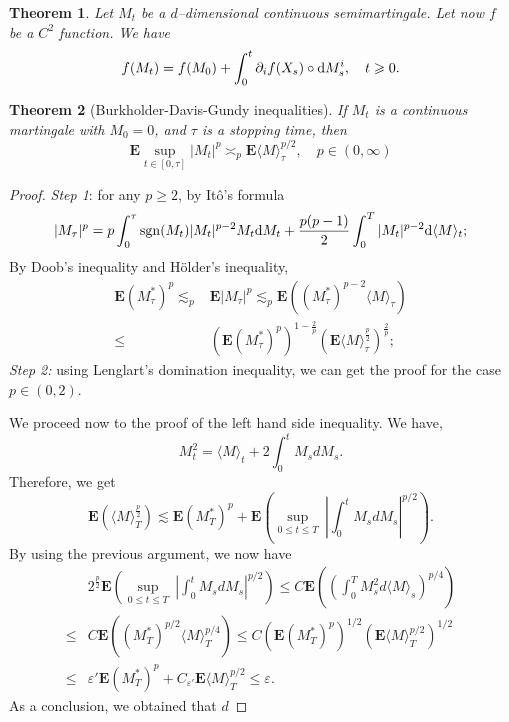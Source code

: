 \documentclass[twoside, 12pt]{book}
\numberwithin{equation}{chapter}
\newtheorem{theorem}{Theorem}[section]
\def\bE{{\mathbf E}}
\def\geq{\geqslant}
\def\leq{\leqslant}
\def\le{\leqslant}
\def\d{\text{\rm{d}}}
\def\eps{\varepsilon}
\begin{document}
\begin{theorem}\label{thm:Stra}
    Let  $M_t$ be a $d$–dimensional continuous semimartingale. Let now $f$ be a $C^2$ function. We have
    \[
    f(M_t)  =f(M_0)+\int_0^t \partial_i f (X_s) \circ \d M^i_s, \quad t \geq 0.
    \]
\end{theorem}
	
	\begin{theorem}[{Burkholder-Davis-Gundy inequalities}]
		If $M_t$ is a continuous martingale with $M_0=0$, and $\tau$ is a stopping time, then 
		\begin{equation}\label{eq:bdg}
			\bE \sup_{t\in[0,\tau]} |M_t|^p \asymp_p \bE \langle M\rangle_\tau^{p/2}, \quad p\in (0,\infty) 
		\end{equation}
	\end{theorem}
	\begin{proof}
		{\em Step 1}: for any $p\geq 2$, by It\^o's formula 
					\[
					|M_\tau|^p = p \int_0^\tau \mathrm{sgn}(M_t)|M_t|^{p-2} M_t \d M_t + \frac{p(p-1)}{2}\int_0^T |M_t|^{p-2} \d \langle M \rangle_t ;
					\]
			By Doob's inequality and H\"older's inequality, 
			\[
					\begin{aligned}
						\bE (M_\tau^*)^p\lesssim_p& \bE |M_\tau|^p  \lesssim_p \bE ( (M_\tau^*)^{p-2} \langle M \rangle_\tau)\\
						\leq& (\bE(M_\tau^*)^p)^{1-\frac{2}{p}} (\bE \langle M \rangle_\tau^{\frac{p}{2}} )^{\frac{2}{p}}; 
					\end{aligned}
			\]
			{\em Step 2:} using Lenglart's domination inequality, 
			 we can get the proof for the case $p\in (0,2)$. 
			 
			 We proceed now to the proof of the left hand side inequality. We have,
			 $$
			     M_t^2 =\langle M \rangle_t +2\int_0^t M_s dM_s.
			 $$
			 Therefore, we get
			 $$
			     \mathbf{E} \left( \langle M\rangle_T^{\frac{p}{2} } \right) \lesssim   \mathbf{E} (M_T^*)^p +  \mathbf{E}\left(\sup_{0 \le t \le T}\ \left| \int_0^t M_s dM_s\right|^{p/2} \right) .
			 $$
			 By using the previous argument, we now have
			 \begin{equation*}
			 	\begin{aligned}
			 		&2^{\frac{p}{2}}\mathbf{E}\left(\sup_{0 \le t \le T}\ \left| \int_0^t M_s dM_s\right|^{p/2} \right)  \le C \mathbf{E}\left( \left( \int_0^T M^2_s d\langle M\rangle_s\right)^{p/4} \right)\\
			 		\leq  & C \mathbf{E}\left((M_T^*)^{p/2} \langle M \rangle_T^{p/4} \right)
			 		\leq C  \left( \mathbf{E} (M_T^*)^{p}\right)^{1/2}  \left( \mathbf{E}  \langle M \rangle_T^{p/2} \right)^{1/2}\\
			 		\leq & \eps'  \mathbf{E} (M_T^*)^{p} + C_{\eps'} \mathbf{E}  \langle M \rangle_T^{p/2} \leq \eps .
			 	\end{aligned}
			 \end{equation*}			 
			 As a conclusion, we obtained that $d$
	\end{proof}
	
\end{document}
